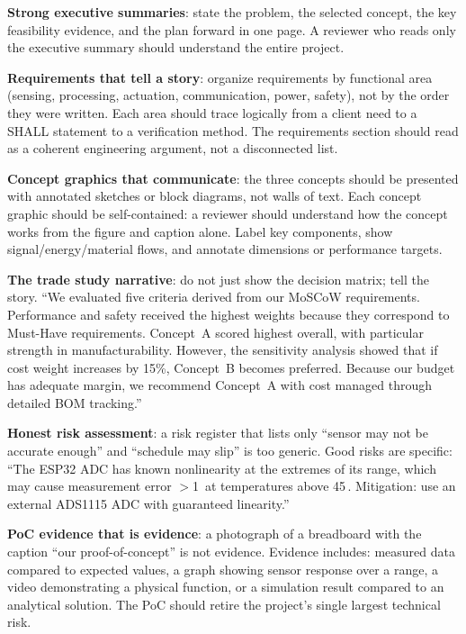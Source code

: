 \textbf{Strong executive summaries}: state the problem, the selected concept, the key feasibility evidence, and the plan forward in one page. A reviewer who reads only the executive summary should understand the entire project.

\textbf{Requirements that tell a story}: organize requirements by functional area (sensing, processing, actuation, communication, power, safety), not by the order they were written. Each area should trace logically from a client need to a SHALL statement to a verification method. The requirements section should read as a coherent engineering argument, not a disconnected list.

\textbf{Concept graphics that communicate}: the three concepts should be presented with annotated sketches or block diagrams, not walls of text. Each concept graphic should be self-contained: a reviewer should understand how the concept works from the figure and caption alone. Label key components, show signal/energy/material flows, and annotate dimensions or performance targets.

\textbf{The trade study narrative}: do not just show the decision matrix; tell the story. ``We evaluated five criteria derived from our MoSCoW requirements. Performance and safety received the highest weights because they correspond to Must-Have requirements. Concept~A scored highest overall, with particular strength in manufacturability. However, the sensitivity analysis showed that if cost weight increases by 15\%, Concept~B becomes preferred. Because our budget has adequate margin, we recommend Concept~A with cost managed through detailed BOM tracking.''

\textbf{Honest risk assessment}: a risk register that lists only ``sensor may not be accurate enough'' and ``schedule may slip'' is too generic. Good risks are specific: ``The ESP32 ADC has known nonlinearity at the extremes of its range, which may cause measurement error $>$1\,\degC{} at temperatures above 45\,\degC{}. Mitigation: use an external ADS1115 ADC with guaranteed linearity.''

\textbf{PoC evidence that is evidence}: a photograph of a breadboard with the caption ``our proof-of-concept'' is not evidence. Evidence includes: measured data compared to expected values, a graph showing sensor response over a range, a video demonstrating a physical function, or a simulation result compared to an analytical solution. The PoC should retire the project's single largest technical risk.



